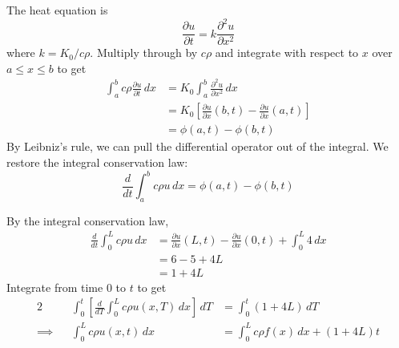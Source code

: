 \documentclass[a4paper]{article}
\begin{document}
The heat equation is
\[
	\frac{\partial u}{\partial t} = k \frac{\partial^{2}u}{\partial x^{2}} 
\]
where \( k = K_{0} / c \rho \). Multiply through by \( c \rho \) and integrate with respect to \( x \) over \( a \le x \le b \) to get
\begin{align*}
	\int^{b}_{a} c \rho \frac{\partial u}{\partial t} \, dx & = K_{0}\int^{b}_{a} \frac{\partial^{2}u}{\partial x^{2}} \, dx \\
								& = K_{0}\!\left[ \frac{\partial u}{\partial x}\!\left( b,t \right) - \frac{\partial u}{\partial x}\!\left( a,t \right) \right] \\
								& = \phi \!\left( a,t \right) - \phi \!\left( b,t \right)
 \end{align*}
By Leibniz's rule, we can pull the differential operator out of the integral. We restore the integral conservation law:
\[
	\frac{d }{dt}\int^{b}_{a} c \rho u \, dx = \phi \!\left( a,t \right) - \phi \!\left( b,t \right)
\]


By the integral conservation law,
\begin{align*}
	\frac{d }{dt}\int^{L}_{0} c \rho u \, dx & = \frac{\partial u}{\partial x}\!\left( L,t \right) - \frac{\partial u}{\partial x}\!\left( 0,t \right) + \int^{L}_{0} 4 \, dx \\
						 & = 6 - 5 + 4L \\
						 & = 1 + 4L
\end{align*}
Integrate from time \( 0 \) to \( t \) to get
\begin{alignat*}{2}
	&& \int^{t}_{0} \!\left[ \frac{d }{dT} \int^{L}_{0} c \rho u \!\left( x,T \right) \, dx \right] \, dT & = \int^{t}_{0} \!\left( 1 + 4L \right) \, dT \\
	\implies && \int^{L}_{0} c \rho u \!\left( x,t \right) \, dx & = \int^{L}_{0} c \rho f \!\left( x \right) \, dx + \!\left( 1 + 4L \right)t \\ 
\end{alignat*}

\end{document}
